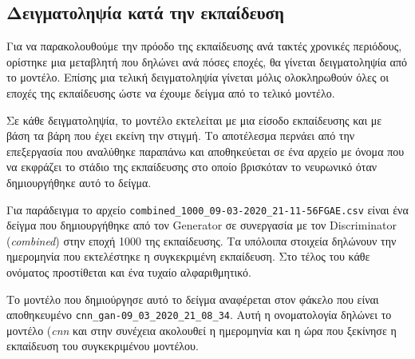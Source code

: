 \subsection{Δειγματοληψία κατά την εκπαίδευση}
Για να παρακολουθούμε την πρόοδο της εκπαίδευσης ανά τακτές χρονικές περιόδους, ορίστηκε μια μεταβλητή που δηλώνει ανά πόσες εποχές, θα γίνεται δειγματοληψία από το μοντέλο. Επίσης μια τελική δειγματοληψία γίνεται μόλις ολοκληρωθούν όλες οι εποχές της εκπαίδευσης ώστε να έχουμε δείγμα από το τελικό μοντέλο. 
\par
Σε κάθε δειγματοληψία, το μοντέλο εκτελείται με μια είσοδο εκπαίδευσης και με βάση τα βάρη που έχει εκείνη την στιγμή. Το αποτέλεσμα περνάει από την επεξεργασία που αναλύθηκε παραπάνω και αποθηκεύεται σε ένα αρχείο με όνομα που να εκφράζει το στάδιο της εκπαίδευσης στο οποίο βρισκόταν το νευρωνικό όταν δημιουργήθηκε αυτό το δείγμα.
\par
Για παράδειγμα το αρχείο \verb|combined_1000_09-03-2020_21-11-56FGAE.csv| είναι ένα δείγμα που δημιουργήθηκε από τον Generator σε συνεργασία με τον Discriminator (\textit{combined}) στην εποχή 1000 της εκπαίδευσης. Τα υπόλοιπα στοιχεία δηλώνουν την ημερομηνία που εκτελέστηκε η συγκεκριμένη εκπαίδευση. Στο τέλος του κάθε ονόματος προστίθεται και ένα τυχαίο αλφαριθμητικό. 
\par
Το μοντέλο που δημιούργησε αυτό το δείγμα αναφέρεται στον φάκελο που είναι αποθηκευμένο \verb|cnn_gan-09_03_2020_21_08_34|. Αυτή η ονοματολογία δηλώνει το μοντέλο (\textit{cnn} και στην συνέχεια ακολουθεί η ημερομηνία και η ώρα που ξεκίνησε η εκπαίδευση του συγκεκριμένου μοντέλου.

